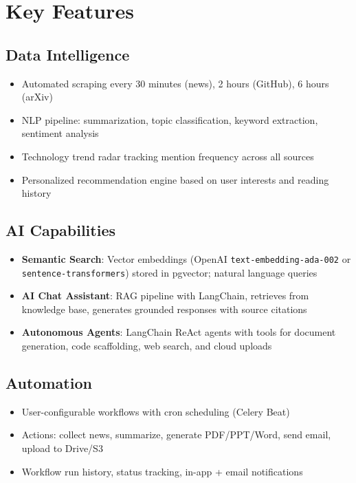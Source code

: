 \documentclass[12pt,a4paper]{report}
\begin{document}
\section{Key Features}

\subsection{Data Intelligence}
\begin{itemize}
    \item Automated scraping every 30 minutes (news), 2 hours (GitHub), 6 hours (arXiv)
    \item NLP pipeline: summarization, topic classification, keyword extraction, sentiment analysis
    \item Technology trend radar tracking mention frequency across all sources
    \item Personalized recommendation engine based on user interests and reading history
\end{itemize}

\subsection{AI Capabilities}
\begin{itemize}
    \item \textbf{Semantic Search}: Vector embeddings (OpenAI \texttt{text-embedding-ada-002}
    or \texttt{sentence-transformers}) stored in pgvector; natural language queries
    \item \textbf{AI Chat Assistant}: RAG pipeline with LangChain, retrieves from knowledge
    base, generates grounded responses with source citations
    \item \textbf{Autonomous Agents}: LangChain ReAct agents with tools for document
    generation, code scaffolding, web search, and cloud uploads
\end{itemize}

\subsection{Automation}
\begin{itemize}
    \item User-configurable workflows with cron scheduling (Celery Beat)
    \item Actions: collect news, summarize, generate PDF/PPT/Word, send email, upload to Drive/S3
    \item Workflow run history, status tracking, in-app + email notifications
\end{itemize}
\end{document}
